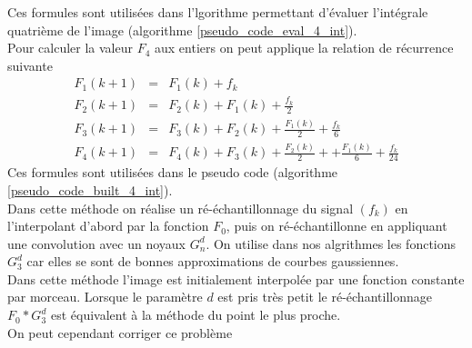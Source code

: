 {\begin{itemize}
\end{itemize}
Ces formules sont utilisées dans l'lgorithme permettant d'évaluer l'intégrale quatrième de l'image (algorithme \ref{pseudo_code_eval_4_int}).\\
Pour calculer la valeur $F_4$ aux entiers on peut applique la relation de récurrence suivante
\begin{eqnarray*}
F_{1}(k+1)&=&  F_{1}(k)+f_{k}  \\
F_{2}(k+1)&=&  F_{2}(k)+F_{1}(k)+\frac{f_{k}}{2}   \\
F_{3}(k+1)&=&  F_{3}(k)+F_{2}(k)+\frac{F_{1}(k)}{2}+\frac{f_{k}}{6}   \\
F_{4}(k+1)&=&  F_{4}(k)+F_{3}(k)+\frac{F_{2}(k)}{2}++\frac{F_{1}(k)}{6}+\frac{f_{k}}{24}  
\end{eqnarray*}
Ces formules sont utilisées dans le pseudo code (algorithme \ref{pseudo_code_built_4_int}).\\
Dans cette méthode on réalise un ré-échantillonnage du signal $(f_k)$ en l'interpolant d'abord par la fonction $F_{0}$, puis on ré-échantillonne en appliquant une convolution avec un noyaux $G_n^d$. On utilise dans nos algrithmes les fonctions $G_3^d$ car elles se sont de bonnes approximations de courbes gaussiennes.\\ %
Dans cette méthode l'image est initialement interpolée par une fonction constante par morceau. Lorsque le paramètre $d$ est pris très petit le ré-échantillonnage $F_{0}*G_3^d$ est équivalent à la méthode du point le plus proche.\\
On peut cependant corriger ce problème

}
